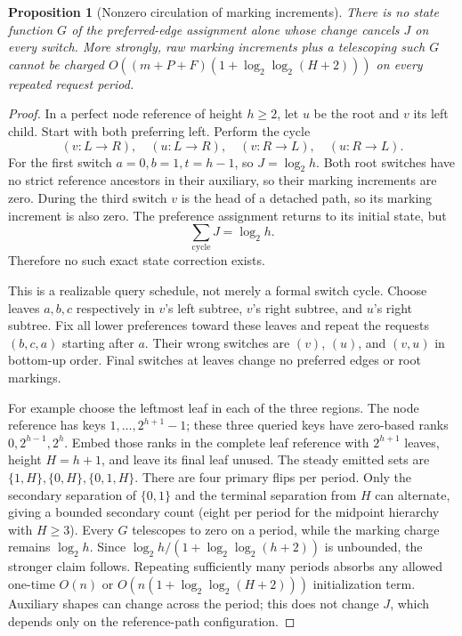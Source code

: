 \documentclass[11pt]{article}
\newtheorem{proposition}[lemma]{Proposition}
\newcommand{\lgx}{\log_2}
\begin{document}
\begin{proposition}[Nonzero circulation of marking increments]
There is no state function $G$ of the preferred-edge assignment alone
whose change cancels $J$ on every switch. More strongly, raw marking
increments plus a telescoping such $G$ cannot be charged
$O((m+P+F)(1+\lgx\lgx(H+2)))$ on every repeated request period.
\end{proposition}
\begin{proof}
In a perfect node reference of height $h\ge2$, let $u$ be the root and
$v$ its left child. Start with both preferring left. Perform the cycle
\[
 (v:L\to R),\quad(u:L\to R),\quad
 (v:R\to L),\quad(u:R\to L).
\]
For the first switch $a=0,b=1,t=h-1$, so $J=\lgx h$.
Both root switches have no strict reference ancestors in their auxiliary,
so their marking increments are zero. During the third switch $v$ is
the head of a detached path, so its marking increment is also zero.
The preference assignment returns to its initial state, but
\[
 \sum_{\mathrm{cycle}}J=\lgx h.
\]
Therefore no such exact state correction exists.

This is a realizable query schedule, not merely a formal switch cycle.
Choose leaves $a,b,c$ respectively in $v$'s left subtree, $v$'s right
subtree, and $u$'s right subtree. Fix all lower preferences toward these
leaves and repeat the requests $(b,c,a)$ starting after $a$. Their wrong
switches are $(v)$, $(u)$, and $(v,u)$ in bottom-up order. Final switches
at leaves change no preferred edges or root markings.

For example choose the leftmost leaf in each of the three regions.
The node reference has keys $1,\ldots,2^{h+1}-1$; these three queried
keys have zero-based ranks $0,2^{h-1},2^h$. Embed those ranks in the
complete leaf reference with $2^{h+1}$ leaves, height $H=h+1$, and
leave its final leaf unused. The steady emitted sets are
$\{1,H\},\{0,H\},\{0,1,H\}$. There are four primary flips
per period. Only the secondary separation of $\{0,1\}$ and the terminal
separation from $H$ can alternate, giving a bounded secondary count
(eight per period for the midpoint hierarchy with $H\ge3$).
Every $G$ telescopes to zero on a period, while the marking charge remains
$\lgx h$. Since $\lgx h/(1+\lgx\lgx(h+2))$ is unbounded, the stronger
claim follows. Repeating sufficiently many periods absorbs any allowed
one-time $O(n)$ or $O(n(1+\lgx\lgx(H+2)))$ initialization term.
Auxiliary shapes can change across the period; this does
not change $J$, which depends only on the reference-path configuration.
\end{proof}
\end{document}

